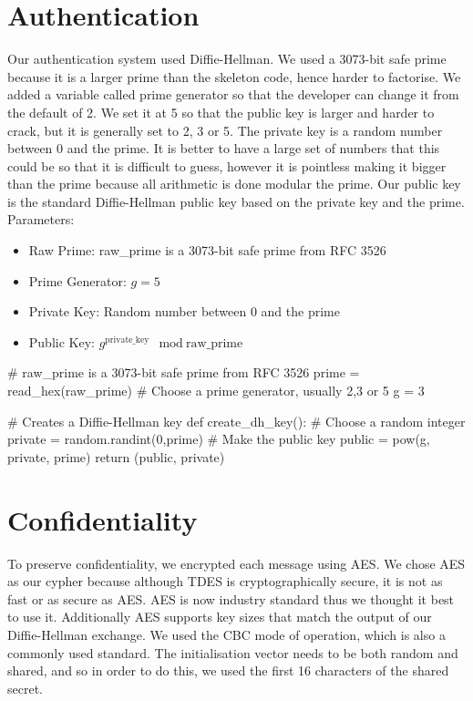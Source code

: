 \documentclass[9pt,a4paper]{article}
\begin{document}
\maketitle
\small
\setlength{\parindent}{0pt}

\section{Authentication}
\vspace{-2ex}
Our authentication system used Diffie-Hellman. We used a 3073-bit safe prime because it is a larger prime than the skeleton code, hence harder to factorise. We added a variable called prime generator so that the developer can change it from the default of 2. We set it at 5 so that the public key is larger and harder to crack, but it is generally set to 2, 3 or 5. The private key is a random number between 0 and the prime. It is better to have a large set of numbers that this could be so that it is difficult to guess, however it is pointless making it bigger than the prime because all arithmetic is done modular the prime. Our public key is the standard Diffie-Hellman public key based on the private key and the prime.\\

Parameters:
\begin{itemize}
\item Raw Prime: raw\_prime is a 3073-bit safe prime from RFC 3526
\item Prime Generator: $g = 5$
\item Private Key: Random number between 0 and the prime
\item Public Key: $g^{\text{private\_key}} \mod \text{raw\_prime}$
\end{itemize}

\begin{center}
\vspace{-2ex}
\begin{python}
# raw_prime is a 3073-bit safe prime from RFC 3526
prime = read_hex(raw_prime)
# Choose a prime generator, usually 2,3 or 5
g = 3

# Creates a Diffie-Hellman key
def create_dh_key():
    # Choose a random integer
    private = random.randint(0,prime)
    # Make the public key
    public  = pow(g, private, prime)
    return (public, private)
\end{python}
\end{center}

\section{Confidentiality}
\vspace{-2ex}
To preserve confidentiality, we encrypted each message using AES. We chose AES as our cypher because although TDES is cryptographically secure, it is not as fast or as secure as AES. AES is now industry standard thus we thought it best to use it. Additionally AES supports key sizes that match the output of our Diffie-Hellman exchange. We used the CBC mode of operation, which is also a commonly used standard. The initialisation vector needs to be both random and shared, and so in order to do this, we used the first 16 characters of the shared secret.
\end{document}

